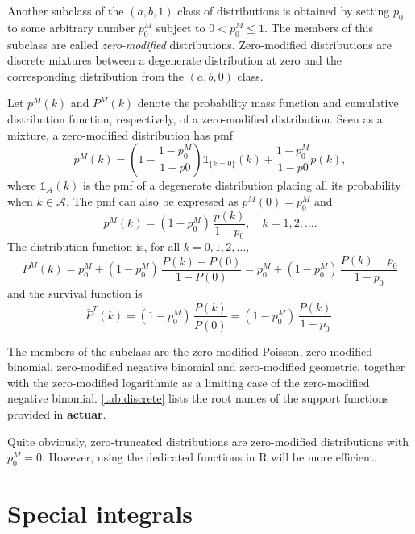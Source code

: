 \documentclass[x11names]{article}
\newcommand{\proglang}[1]{\textsf{#1}}
\newcommand{\pkg}[1]{\textbf{#1}}
\begin{document}
Another subclass of the $(a, b, 1)$ class of distributions is obtained
by setting $p_0$ to some arbitrary number $p_0^M$ subject to
$0 < p_0^M \leq 1$. The members of this subclass are called
\emph{zero-modified} distributions. Zero-modified distributions are
discrete mixtures between a degenerate distribution at zero and the
corresponding distribution from the $(a, b, 0)$ class.

Let $p^M(k)$ and $P^M(k)$ denote the probability mass function and
cumulative distribution function, respectively, of a zero-modified
distribution. Seen as a mixture, a zero-modified distribution has pmf
\begin{equation*}
  p^M(k) = \left(1 - \frac{1 - p_0^M}{1 - p0} \right) \mathbb{1}_{\{k = 0\}}(k)
  + \frac{1 - p_0^M}{1 - p0} p(k),
\end{equation*}
where $\mathbb{1}_{\mathcal{A}}(k)$ is the pmf of a degenerate
distribution placing all its probability when $k \in \mathcal{A}$. The
pmf can also be expressed as $p^M(0) = p_0^M$ and
\begin{equation*}
  p^M(k) = (1 - p_0^M)\, \frac{p(k)}{1 - p_0}, \quad k = 1, 2, \dots.
\end{equation*}
The distribution function is, for all $k = 0, 1, 2, \dots$,
\begin{equation*}
  P^M(k)
  = p_0^M + (1 - p_0^M)\, \frac{P(k) - P(0)}{1 - P(0)}
  = p_0^M + (1 - p_0^M)\, \frac{P(k) - p_0}{1 - p_0}
\end{equation*}
and the survival function is
\begin{equation*}
  \bar{P}^T(k)
  = (1 - p_0^M)\, \frac{\bar{P}(k)}{\bar{P}(0)}
  = (1 - p_0^M)\, \frac{\bar{P}(k)}{1 - p_0}.
\end{equation*}

The members of the subclass are the zero-modified Poisson,
zero-modified binomial, zero-modified negative binomial and
zero-modified geometric, together with the zero-modified logarithmic
as a limiting case of the zero-modified negative binomial.
\autoref{tab:discrete} lists the root names of the support functions
provided in \pkg{actuar}.

Quite obviously, zero-truncated distributions are zero-modified
distributions with $p_0^M = 0$. However, using the dedicated functions
in \proglang{R} will be more efficient.


\section{Special integrals}
\label{sec:special-integrals}
\end{document}
